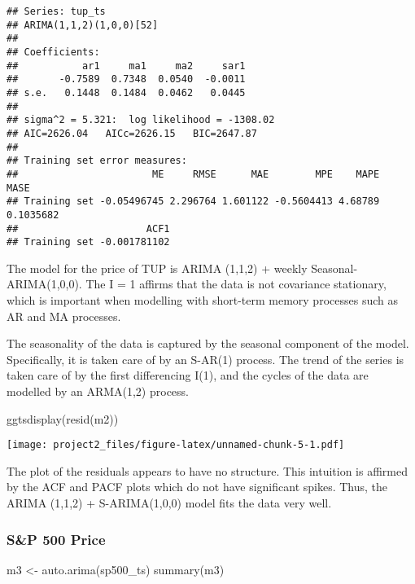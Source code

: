 \documentclass[
  10.5pt,
]{article}
\newenvironment{Shaded}{\begin{snugshade}}{\end{snugshade}}
\newcommand{\FunctionTok}[1]{\textcolor[rgb]{0.00,0.00,0.00}{#1}}
\newcommand{\NormalTok}[1]{#1}
\newcommand{\OtherTok}[1]{\textcolor[rgb]{0.56,0.35,0.01}{#1}}
\begin{document}
\begin{verbatim}
## Series: tup_ts 
## ARIMA(1,1,2)(1,0,0)[52] 
## 
## Coefficients:
##           ar1     ma1     ma2     sar1
##       -0.7589  0.7348  0.0540  -0.0011
## s.e.   0.1448  0.1484  0.0462   0.0445
## 
## sigma^2 = 5.321:  log likelihood = -1308.02
## AIC=2626.04   AICc=2626.15   BIC=2647.87
## 
## Training set error measures:
##                       ME     RMSE      MAE        MPE    MAPE      MASE
## Training set -0.05496745 2.296764 1.601122 -0.5604413 4.68789 0.1035682
##                      ACF1
## Training set -0.001781102
\end{verbatim}

The model for the price of TUP is ARIMA (1,1,2) + weekly
Seasonal-ARIMA(1,0,0). The I = 1 affirms that the data is not covariance
stationary, which is important when modelling with short-term memory
processes such as AR and MA processes.

The seasonality of the data is captured by the seasonal component of the
model. Specifically, it is taken care of by an S-AR(1) process. The
trend of the series is taken care of by the first differencing I(1), and
the cycles of the data are modelled by an ARMA(1,2) process.

\begin{Shaded}
\begin{Highlighting}[]
\FunctionTok{ggtsdisplay}\NormalTok{(}\FunctionTok{resid}\NormalTok{(m2))}
\end{Highlighting}
\end{Shaded}

\texttt{[image: project2\_files/figure-latex/unnamed-chunk-5-1.pdf]}

The plot of the residuals appears to have no structure. This intuition
is affirmed by the ACF and PACF plots which do not have significant
spikes. Thus, the ARIMA (1,1,2) + S-ARIMA(1,0,0) model fits the data
very well.

\hypertarget{sp-500-price}{%
\subsubsection{S\&P 500 Price}\label{sp-500-price}}

\begin{Shaded}
\begin{Highlighting}[]
\NormalTok{m3 }\OtherTok{\textless{}{-}} \FunctionTok{auto.arima}\NormalTok{(sp500\_ts)}
\FunctionTok{summary}\NormalTok{(m3)}
\end{Highlighting}
\end{Shaded}
\end{document}
